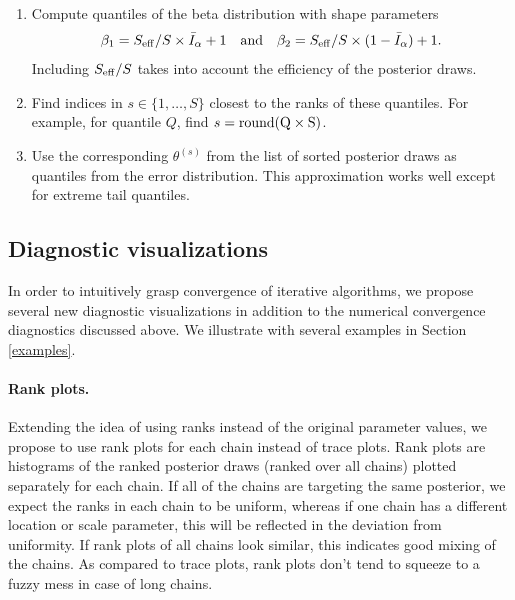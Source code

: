 \documentclass[american,]{article}
\let\oldparagraph\paragraph
\renewcommand{\paragraph}[1]{\oldparagraph{#1}\mbox{}}
\theoremstyle{definition}
\begin{document}
\begin{enumerate}
\def\labelenumi{\arabic{enumi}.}
\item
  Compute quantiles of the beta distribution with shape parameters
  \begin{equation}
  \beta_1 = S_{\rm eff} / S \times \bar{I}_\alpha+1 \quad \text{and} \quad
  \beta_2 = S_{\rm eff} / S \times (1-\bar{I}_\alpha) + 1.
  \end{equation} Including \(S_{\rm eff}/S\) takes into account the
  efficiency of the posterior draws.
\item
  Find indices in \(s \in \{1,\ldots,S\}\) closest to the ranks of these
  quantiles. For example, for quantile \(Q\), find
  \(s = {\rm round(Q \times S)}\).
\item
  Use the corresponding \(\theta^{(s)}\) from the list of sorted
  posterior draws as quantiles from the error distribution. This
  approximation works well except for extreme tail quantiles.
\end{enumerate}


\hypertarget{diagnostic-visualizations}{%
\subsection{Diagnostic visualizations}\label{diagnostic-visualizations}}

In order to intuitively grasp convergence of iterative algorithms, we
propose several new diagnostic visualizations in addition to the numerical
convergence diagnostics discussed above. We illustrate with several examples in Section
\ref{examples}.

\hypertarget{rank-plots}{%
\paragraph{Rank plots.}\label{rank-plots}}
Extending the idea of using ranks instead of the original parameter
values, we propose to use rank plots for each chain instead
of trace plots. Rank plots are histograms of the
ranked posterior draws (ranked over all chains) plotted separately for
each chain. If all of the chains are targeting the same posterior, we expect the 
ranks in each chain to be uniform, whereas if one chain has a different location
or scale parameter, this will be reflected in the deviation from uniformity. 
 If rank plots of all chains look similar, this indicates
good mixing of the chains. As compared to trace plots, rank plots don't
tend to squeeze to a fuzzy mess in case of long chains.
\end{document}
